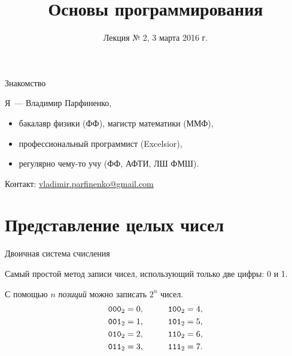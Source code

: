 %




\newcommand{\code}[1]{\texttt{#1}}


\title{Основы программирования}
\subtitle{Лекция № 2, 3 марта 2016 г.}
\date{}




\begin{frame}[plain]
  \titlepage
\end{frame}

\begin{frame}{Знакомство}

  Я~--- Владимир Парфиненко,

  \begin{itemize}
    \item бакалавр физики (ФФ), магистр математики (ММФ),
    \item профессиональный программист (Excelsior),
    \item регулярно чему-то учу (ФФ, АФТИ, ЛШ ФМШ).
  \end{itemize}

  Контакт:
  \href{mailto:vladimir.parfinenko@gmail.com}{vladimir.parfinenko@gmail.com}

\end{frame}

\section{Представление целых чисел}

\begin{frame}{Двоичная система счисления}

  Самый простой метод записи чисел, использующий только две цифры: 0 и 1.

  С помощью $n$ \emph{позиций} можно записать $2^n$ чисел.
  \begin{align*}
    \mathtt{000}_2 &= 0, &\qquad \mathtt{100}_2 &= 4, \\
    \mathtt{001}_2 &= 1, &\qquad \mathtt{101}_2 &= 5, \\
    \mathtt{010}_2 &= 2, &\qquad \mathtt{110}_2 &= 6, \\
    \mathtt{011}_2 &= 3, &\qquad \mathtt{111}_2 &= 7.
  \end{align*}
\end{frame}

